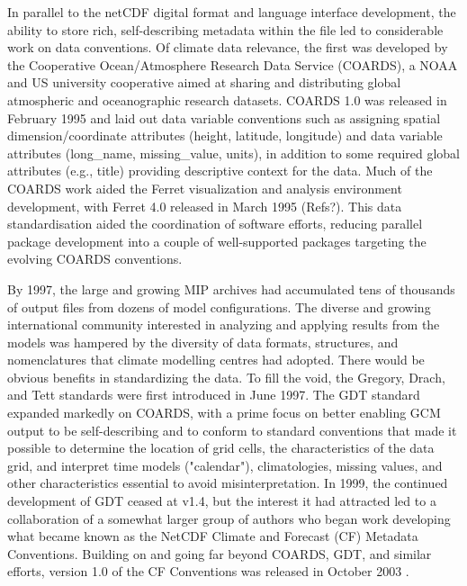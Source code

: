 \documentclass[gmd, preprint]{copernicus}
\newcommand{\mycomment}[1]{}
\def\cred#1{{\color{red}#1}}
\begin{document}
In parallel to the netCDF digital format and language interface development, the ability to store rich, self-describing metadata within the file led to considerable work on data conventions. Of climate data relevance, the first was developed by the Cooperative Ocean/Atmosphere Research Data Service (COARDS), a NOAA and US university cooperative aimed at sharing and distributing global atmospheric and oceanographic research datasets. COARDS 1.0 was released in February 1995 and laid out data variable conventions such as assigning spatial dimension/coordinate attributes (height, latitude, longitude) and data variable attributes (long\_name, missing\_value, units), in addition to some required global attributes (e.g., title) providing descriptive context for the data. Much of the COARDS work aided the Ferret visualization and analysis environment development, with Ferret 4.0 released in March 1995 \cred{(Refs?)}. This data standardisation aided the coordination of software efforts, reducing parallel package development into a couple of well-supported packages targeting the evolving COARDS conventions.
\mycomment{
https://ferret.pmel.noaa.gov/Ferret/documentation/coards-netcdf-conventions
https://ferret.pmel.noaa.gov/static/Documentation/Release_Notes/v400.html
Also NCAR CSM - see http://cfconventions.org/conventions.html
}

By 1997, the large and growing MIP archives had accumulated tens of thousands of output files from dozens of model configurations. The diverse and growing international community interested in analyzing and applying results from the models was hampered by the diversity of data formats, structures, and nomenclatures that climate modelling centres had adopted. There would be obvious benefits in standardizing the data. To fill the void, the Gregory, Drach, and Tett \citep[GDT v0;][]{gregory_gdt_1999} standards were first introduced in June 1997. The GDT standard expanded markedly on COARDS, with a prime focus on better enabling GCM output to be self-describing and to conform to standard conventions that made it possible to determine the location of grid cells, the characteristics of the data grid, and interpret time models ("calendar"), climatologies, missing values, and other characteristics essential to avoid misinterpretation. In 1999, the continued development of GDT ceased at v1.4, but the interest it had attracted led to a collaboration of a somewhat larger group of authors who began work developing what became known as the NetCDF Climate and Forecast (CF) Metadata Conventions. Building on and going far beyond COARDS, GDT, and similar efforts, version 1.0 of the CF Conventions was released in October 2003 \citep{eaton_netcdf_2024}.  
\end{document}
